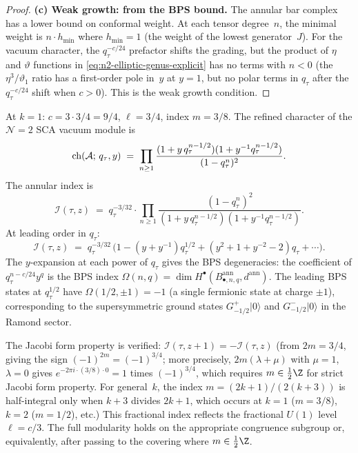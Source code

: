 \begin{proof}
\medskip\noindent
\textbf{(c) Weak growth: from the BPS bound.}
The annular bar complex has a lower bound on conformal
weight. At each tensor degree~$n$, the minimal weight
is $n\cdot h_{\min}$ where $h_{\min} = 1$ (the weight
of the lowest generator~$J$). For the vacuum character,
the $q_\tau^{-c/24}$ prefactor shifts the grading, but the
product of $\eta$ and $\vartheta$ functions in
\eqref{eq:n2-elliptic-genus-explicit} has no terms with
$n < 0$ (the $\eta^3/\vartheta_1$ ratio has a first-order
pole in~$y$ at $y=1$, but no polar terms in $q_\tau$
after the $q_\tau^{-c/24}$ shift when $c > 0$). This is
the weak growth condition.
\end{proof}

\begin{computation}[Explicit index: $\mathcal N=2$ at
$k=1$; \ClaimStatusProvedHere]%
\label{comp:n2-index-k1}%
%
At $k=1$: $c = 3\cdot 3/4 = 9/4$, $\ell = 3/4$,
index $m = 3/8$. The refined character of the
$\mathcal N=2$ SCA vacuum module is
\[
\operatorname{ch}(\mathcal{A};\,q_\tau,y)
\;=\;
\prod_{n\ge 1}
\frac{(1+y\,q_\tau^{n-1/2})(1+y^{-1}q_\tau^{n-1/2})}
{(1-q_\tau^n)^2}.
\]
The annular index is
\[
\mathcal{I}(\tau,z)
\;=\;
q_\tau^{-3/32}\cdot
\prod_{n\ge 1}
\frac{(1-q_\tau^n)^2}
{(1+y\,q_\tau^{n-1/2})(1+y^{-1}q_\tau^{n-1/2})}.
\]
At leading order in $q_\tau$:
\[
\mathcal{I}(\tau,z)
\;=\;
q_\tau^{-3/32}\,
\bigl(1 - (y+y^{-1})q_\tau^{1/2}
+ (y^2 + 1 + y^{-2} - 2)q_\tau + \cdots\bigr).
\]
The $y$-expansion at each power of $q_\tau$ gives the
BPS degeneracies: the coefficient of $q_\tau^{n-c/24}y^q$
is the BPS index $\Omega(n,q) = \dim H^\bullet(
B^{\mathrm{ann}}_{\bullet,n,q},d^{\mathrm{ann}})$.
The leading BPS states at $q_\tau^{1/2}$ have
$\Omega(1/2,\pm 1) = -1$ (a single fermionic state at
charge $\pm 1$), corresponding to the supersymmetric
ground states $G^+_{-1/2}|0\rangle$ and
$G^-_{-1/2}|0\rangle$ in the Ramond sector.

The Jacobi form property is verified:
$\mathcal{I}(\tau,z+1) = -\mathcal{I}(\tau,z)$
(from $2m = 3/4$, giving the sign
$(-1)^{2m} = (-1)^{3/4}$; more precisely, $2m(\lambda+\mu)$
with $\mu=1$, $\lambda=0$ gives
$e^{-2\pi i\cdot(3/8)\cdot 0} = 1$ times
$(-1)^{3/4}$, which requires $m\in\frac12\Z$ for strict
Jacobi form property. For general~$k$, the index
$m = (2k+1)/(2(k+3))$ is half-integral only when $k+3$
divides $2k+1$, which occurs at $k = 1$ ($m = 3/8$),
$k = 2$ ($m = 1/2$), etc.)
This fractional index reflects the fractional $U(1)$
level $\ell = c/3$. The full modularity holds on the
appropriate congruence subgroup or, equivalently, after
passing to the covering where $m\in\frac12\Z$.
\end{computation}


